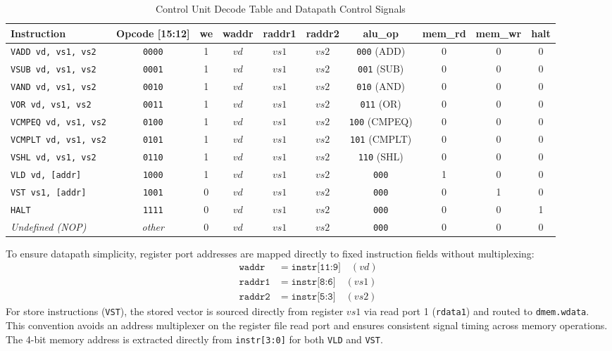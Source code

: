 \begin{table}[t]
  \centering
  \caption{Control Unit Decode Table and Datapath Control Signals}
  \label{tab:control_signals}
  \begin{tabular}{lccccccccc}
    \toprule
    \textbf{Instruction} & \textbf{Opcode [15:12]} & \textbf{we} & \textbf{waddr} & \textbf{raddr1} & \textbf{raddr2} & \textbf{alu\_op} & \textbf{mem\_rd} & \textbf{mem\_wr} & \textbf{halt} \\
    \midrule
    \texttt{VADD vd, vs1, vs2}   & \texttt{0000} & 1 & $vd$  & $vs1$ & $vs2$ & \texttt{000} (ADD)   & 0 & 0 & 0 \\
    \texttt{VSUB vd, vs1, vs2}   & \texttt{0001} & 1 & $vd$  & $vs1$ & $vs2$ & \texttt{001} (SUB)   & 0 & 0 & 0 \\
    \texttt{VAND vd, vs1, vs2}   & \texttt{0010} & 1 & $vd$  & $vs1$ & $vs2$ & \texttt{010} (AND)   & 0 & 0 & 0 \\
    \texttt{VOR vd, vs1, vs2}    & \texttt{0011} & 1 & $vd$  & $vs1$ & $vs2$ & \texttt{011} (OR)    & 0 & 0 & 0 \\
    \texttt{VCMPEQ vd, vs1, vs2} & \texttt{0100} & 1 & $vd$  & $vs1$ & $vs2$ & \texttt{100} (CMPEQ) & 0 & 0 & 0 \\
    \texttt{VCMPLT vd, vs1, vs2} & \texttt{0101} & 1 & $vd$  & $vs1$ & $vs2$ & \texttt{101} (CMPLT) & 0 & 0 & 0 \\
    \texttt{VSHL vd, vs1, vs2}   & \texttt{0110} & 1 & $vd$  & $vs1$ & $vs2$ & \texttt{110} (SHL)   & 0 & 0 & 0 \\
    \texttt{VLD vd, [addr]}      & \texttt{1000} & 1 & $vd$  & $vs1$ & $vs2$ & \texttt{000}         & 1 & 0 & 0 \\
    \texttt{VST vs1, [addr]}     & \texttt{1001} & 0 & $vd$  & $vs1$ & $vs2$ & \texttt{000}         & 0 & 1 & 0 \\
    \texttt{HALT}                & \texttt{1111} & 0 & $vd$  & $vs1$ & $vs2$ & \texttt{000}         & 0 & 0 & 1 \\
    \textit{Undefined (NOP)}     & \textit{other}& 0 & $vd$  & $vs1$ & $vs2$ & \texttt{000}         & 0 & 0 & 0 \\
    \bottomrule
  \end{tabular}
\end{table}

To ensure datapath simplicity, register port addresses are mapped directly to fixed instruction fields without multiplexing:
\begin{align}
  \texttt{waddr}  &= \texttt{instr[11:9]} \quad (vd) \\
  \texttt{raddr1} &= \texttt{instr[8:6]}  \quad (vs1) \\
  \texttt{raddr2} &= \texttt{instr[5:3]}  \quad (vs2)
\end{align}
For store instructions (\texttt{VST}), the stored vector is sourced directly from register $vs1$ via read port 1 (\texttt{rdata1}) and routed to \texttt{dmem.wdata}. This convention avoids an address multiplexer on the register file read port and ensures consistent signal timing across memory operations. The 4-bit memory address is extracted directly from \texttt{instr[3:0]} for both \texttt{VLD} and \texttt{VST}.

